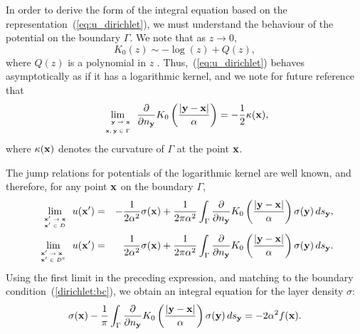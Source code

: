 \documentclass[preprint,12pt]{elsarticle}
\newcommand{\x}{{\bf x}}
\newcommand{\y}{{\bf y}}
\newcommand{\pderiv}[2]{\frac{\partial #1}{\partial #2}}
\newcommand{\eqr}[1]{~(\ref{#1})}
\begin{document}
In order to derive the form of the integral equation based on the representation\eqr{eq:u_dirichlet}, we must understand the behaviour of the potential on the boundary $\Gamma$. 
We note that as $z \rightarrow 0$, 
\[
 K_0 (z) \sim -\log(z) + Q(z), 
\]
where $Q(z)$ is a polynomial in $z$ \cite{ABRAM}. 
Thus,\eqr{eq:u_dirichlet} behaves asymptotically as if it has a logarithmic kernel, and we note for future reference that 
\begin{equation}
  \lim_{\tiny{\begin{array}{r}\y \rightarrow \x \smallskip \label{jump2} \\
        \x, \y \in \Gamma
      \end{array} }}
  \pderiv{}{n_{\y}}K_{0}\left(\frac{|\y-\x|}{\alpha}\right) = 
  -\frac{1}{2}\kappa(\x),
\end{equation}
where $\kappa(\x)$ denotes the curvature of $\Gamma$ at the point
$\x$.

The jump relations for potentials of the logarithmic kernel are well known, and therefore,  for  any point $\x$ on the boundary $\Gamma$,
\begin{eqnarray*}
  \lim_{\tiny{\begin{array}{l}
        \x'  \rightarrow \x  \\
        \x'  \in  D 
      \end{array} }}
  u(\x')& = &  
  -\frac{1}{2\alpha^2}\sigma(\x)+\frac{1}{2\pi\alpha^2}\int_{\Gamma}
  \pderiv{}{n_{\y}}K_{0}\left(\frac{|\y-\x|}{\alpha}\right)
  \sigma(\y)\, ds_{\y}, \\
  \lim_{\tiny{\begin{array}{l}
        \x'  \rightarrow  \x \\
        \x'  \in  D^c 
      \end{array} }}
  u(\x')& = &  \frac{1}{2\alpha^2}\sigma(\x)+
  \frac{1}{2\pi\alpha^2}\int_{\Gamma}\pderiv{}{n_{\y}}
  K_{0}\left(\frac{|\y-\x|}{\alpha}\right)\sigma(\y)\, ds_{\y}.
\end{eqnarray*}
Using the first limit in the preceding expression, and matching to the boundary condition\eqr{dirichlet:bc}, we obtain an integral equation for the layer density $\sigma$:
\begin{equation}
  \label{dirichlet:inteqn}
\sigma(\x)- \frac{1}{\pi}
  \int_{\Gamma}\pderiv{}{n_{\y}}K_{0}\left(\frac{|\y - \x|}{\alpha}\right)
  \sigma(\y)\, ds_{\y} = -2 \alpha^2 f(\x) .
\end{equation}
\end{document}
